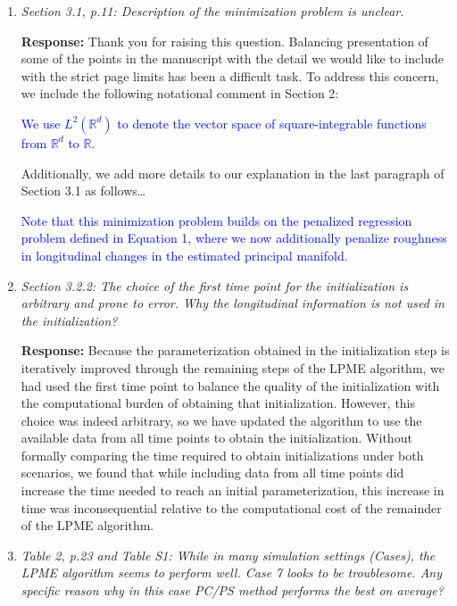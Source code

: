 \documentclass[12pt]{article}
\theoremstyle{definition}
\newcommand{\revision}[1]{\textcolor{blue}{#1}}
\begin{document}
\begin{enumerate}
\item \textit{Section 3.1, p.11: Description of the minimization problem is unclear.}

{\bf Response:} Thank you for raising this question. Balancing presentation of some of the points in the manuscript with the detail we would like to include with the strict page limits has been a difficult task. To address this concern, we include the following notational comment in Section 2:

\revision{We use $L^2(\mathbb{R}^d)$ to denote the vector space of square-integrable functions from $\mathbb{R}^d$ to $\mathbb{R}$}.

Additionally, we add more details to our explanation in the last paragraph of Section 3.1 as follows\dots

\revision{Note that this minimization problem builds on the penalized regression problem defined in Equation 1, where we now additionally penalize roughness in longitudinal changes in the estimated principal manifold.}


\item \textit{Section 3.2.2:    The choice of the first time point for the initialization is arbitrary and prone to error. Why the longitudinal information is not used in the initialization?}

{\bf Response:} Because the parameterization obtained in the initialization step is iteratively improved through the remaining steps of the LPME algorithm, we had used the first time point to balance the quality of the initialization with the computational burden of obtaining that initialization. However, this choice was indeed arbitrary, so we have updated the algorithm to use the available data from all time points to obtain the initialization. Without formally comparing the time required to obtain initializations under both scenarios, we found that while including data from all time points did increase the time needed to reach an initial parameterization, this increase in time was inconsequential relative to the computational cost of the remainder of the LPME algorithm.


\item \textit{Table 2, p.23 and Table S1: While in many simulation settings (Cases), the LPME algorithm seems to perform well. Case 7 looks to be troublesome. Any specific reason why in this case PC/PS method performs the best on average?}


\end{enumerate}
\end{document}
